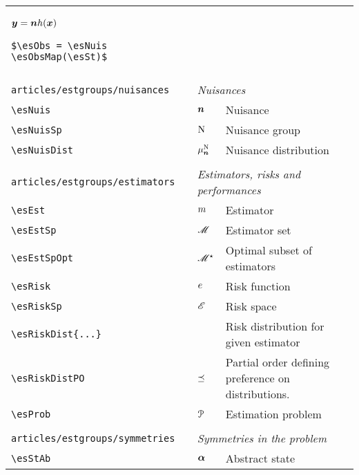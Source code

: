 \begin{longtable}{lll}
{{\begin{minipage}[]{8cm}
$\boldsymbol{y} = \boldsymbol{n} h(\boldsymbol{x})$\par%
{\small{\texttt{\$\textbackslash esObs = \textbackslash esNuis \textbackslash esObsMap(\textbackslash esSt)\$}}}\end{minipage}%
}%
}%
\\ 
  &  & \\ 
 {\color[rgb]{0.5,0.5,0.5}\texttt{articles/estgroups/nuisances}} & \multicolumn{2}{l}{\emph{Nuisances}}\\ 
 \hline
{\color[rgb]{0.5,0.5,0.5}\texttt{\textbackslash esNuis}} & $\boldsymbol{n}$ &  Nuisance\\ 
 {\color[rgb]{0.5,0.5,0.5}\texttt{\textbackslash esNuisSp}} & $\mathrm{N}$ &  Nuisance group\\ 
 {\color[rgb]{0.5,0.5,0.5}\texttt{\textbackslash esNuisDist}} & $\mu^{\mathrm{N}}_{\boldsymbol{n}}$ &  Nuisance distribution\\ 
  &  & \\ 
 {\color[rgb]{0.5,0.5,0.5}\texttt{articles/estgroups/estimators}} & \multicolumn{2}{l}{\emph{Estimators, risks and performances}}\\ 
 \hline
{\color[rgb]{0.5,0.5,0.5}\texttt{\textbackslash esEst}} & $m$ &  Estimator\\ 
 {\color[rgb]{0.5,0.5,0.5}\texttt{\textbackslash esEstSp}} & $\mathscr{M}$ &  Estimator set\\ 
 {\color[rgb]{0.5,0.5,0.5}\texttt{\textbackslash esEstSpOpt}} & $\mathscr{M}^\star$ &  Optimal subset of estimators\\ 
 {\color[rgb]{0.5,0.5,0.5}\texttt{\textbackslash esRisk}} & $e$ &  Risk function\\ 
 {\color[rgb]{0.5,0.5,0.5}\texttt{\textbackslash esRiskSp}} & $\mathscr{E}$ &  Risk space\\ 
 {\color[rgb]{0.5,0.5,0.5}\texttt{\textbackslash esRiskDist\{...\}}} &  &  Risk distribution for given estimator\\ 
 {\color[rgb]{0.5,0.5,0.5}\texttt{\textbackslash esRiskDistPO}} & $\preceq$ &  Partial order defining preference on distributions.\\ 
 {\color[rgb]{0.5,0.5,0.5}\texttt{\textbackslash esProb}} & $\mathcal{P}$ &  Estimation problem\\ 
  &  & \\ 
 {\color[rgb]{0.5,0.5,0.5}\texttt{articles/estgroups/symmetries}} & \multicolumn{2}{l}{\emph{Symmetries in the problem}}\\ 
 \hline
{\color[rgb]{0.5,0.5,0.5}\texttt{\textbackslash esStAb}} & $\boldsymbol{\alpha}$ &  Abstract state\\ 

\end{longtable}
